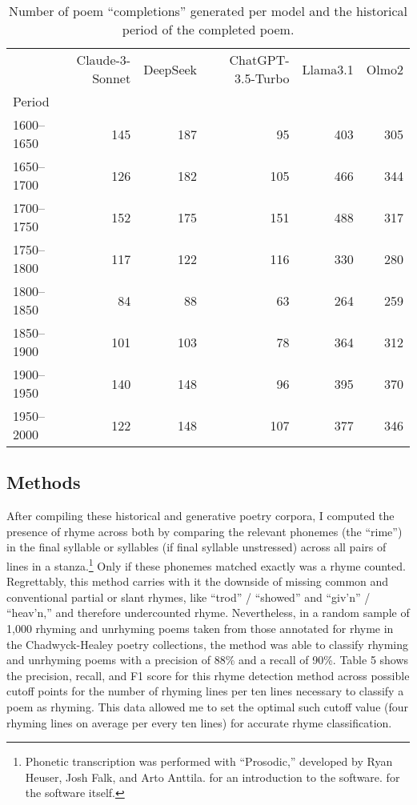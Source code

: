 \documentclass{simple-humanities}         %
\begin{document}
\begin{table}[H]
  \centering
  \small
  \singlespacing
  \begin{tabular}{lrrrrr}
    \toprule
     & Claude-3-Sonnet & DeepSeek & ChatGPT-3.5-Turbo & Llama3.1 & Olmo2 \\
    Period &  &  &  &  &  \\
    \midrule
    1600--1650 & 145 & 187 & 95 & 403 & 305 \\
    1650--1700 & 126 & 182 & 105 & 466 & 344 \\
    1700--1750 & 152 & 175 & 151 & 488 & 317 \\
    1750--1800 & 117 & 122 & 116 & 330 & 280 \\
    1800--1850 & 84 & 88 & 63 & 264 & 259 \\
    1850--1900 & 101 & 103 & 78 & 364 & 312 \\
    1900--1950 & 140 & 148 & 96 & 395 & 370 \\
    1950--2000 & 122 & 148 & 107 & 377 & 346 \\
    \bottomrule
    \end{tabular}    
    \caption{Number of poem ``completions'' generated per model and the historical period of the completed poem.}
    \label{tab:num_poems_completed_models}
    \end{table}


\subsection{Methods}

After compiling these historical and generative poetry corpora, I computed the presence of rhyme across both by comparing the relevant phonemes (the ``rime'') in the final syllable or syllables (if final syllable unstressed) across all pairs of lines in a stanza.\footnote{Phonetic transcription was performed with ``Prosodic,'' developed by Ryan Heuser, Josh Falk, and Arto Anttila. \textcite{anttilaPhonologicalMetricalVariation2015a} for an introduction to the software. \textcite{heuserProsodic} for the software itself.}
Only if these phonemes matched exactly was a rhyme counted.
Regrettably, this method carries with it the downside of missing common and conventional partial or slant rhymes, like ``trod'' / ``showed'' and ``giv'n'' / ``heav'n,'' and therefore undercounted rhyme.
Nevertheless, in a random sample of 1,000 rhyming and unrhyming poems taken from those annotated for rhyme in the Chadwyck-Healey poetry collections, the method was able to classify rhyming and unrhyming poems with a precision of 88\% and a recall of 90\%.
Table 5 shows the precision, recall, and F1 score for this rhyme detection method across possible cutoff points for the number of rhyming lines per ten lines necessary to classify a poem as rhyming.
This data allowed me to set the optimal such cutoff value (four rhyming lines on average per every ten lines) for accurate rhyme classification.
\end{document}
